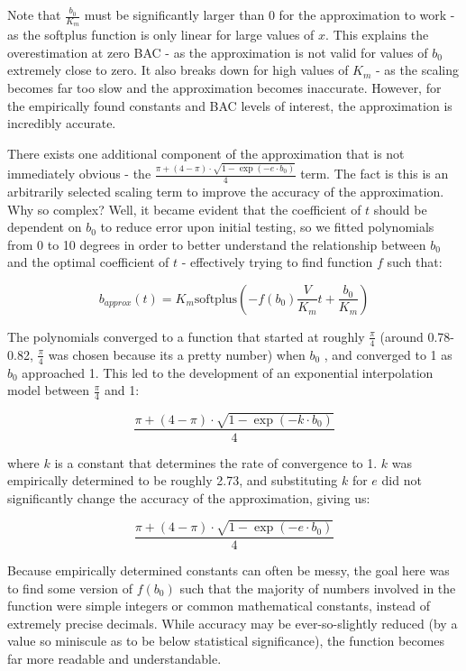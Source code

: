 \documentclass[12pt]{article}
\begin{document}
Note that $\frac{b_0}{K_m}$ must be significantly larger than $0$ for the approximation to work - as the softplus function is only linear for large values of $x$. This explains the overestimation at zero BAC - as the approximation is not valid for values of $b_0$ extremely close to zero. It also breaks down for high values of $K_m$ - as the scaling becomes far too slow and the approximation becomes inaccurate. However, for the empirically found constants and BAC levels of interest, the approximation is incredibly accurate.

There exists one additional component of the approximation that is not immediately obvious - the $\frac{\pi + (4 - \pi) \cdot \sqrt{1 - \exp(-e \cdot b_0)}}{4}$ term. The fact is this is an arbitrarily selected scaling term to improve the accuracy of the approximation. Why so complex? Well, it became evident that the coefficient of $t$ should be dependent on $b_0$ to reduce error upon initial testing, so we fitted polynomials from 0 to 10 degrees in order to better understand the relationship between $b_0$ and the optimal coefficient of $t$ - effectively trying to find function $f$ such that:

$$
    b_{approx}(t) = K_m\mathrm{softplus}(-f(b_0)\frac{V}{K_m}t + \frac{b_0}{K_m})
$$

The polynomials converged to a function that started at roughly $\frac{\pi}{4}$ (around 0.78-0.82, $\frac{\pi}{4}$ was chosen because its a pretty number) when $b_0$ , and converged to 1 as $b_0$ approached 1. This led to the development of an exponential interpolation model between $\frac{\pi}{4}$ and 1:

$$
    \frac{\pi + (4 - \pi) \cdot \sqrt{1 - \exp(-k \cdot b_0)}}{4}
$$

where $k$ is a constant that determines the rate of convergence to 1. $k$ was empirically determined to be roughly 2.73, and substituting $k$ for $e$ did not significantly change the accuracy of the approximation, giving us:

$$
    \frac{\pi + (4 - \pi) \cdot \sqrt{1 - \exp(-e \cdot b_0)}}{4}
$$

Because empirically determined constants can often be messy, the goal here was to find some version of $f(b_0)$ such that the majority of numbers involved in the function were simple integers or common mathematical constants, instead of extremely precise decimals. While accuracy may be ever-so-slightly reduced (by a value so miniscule as to be below statistical significance), the function becomes far more readable and understandable.
\end{document}
